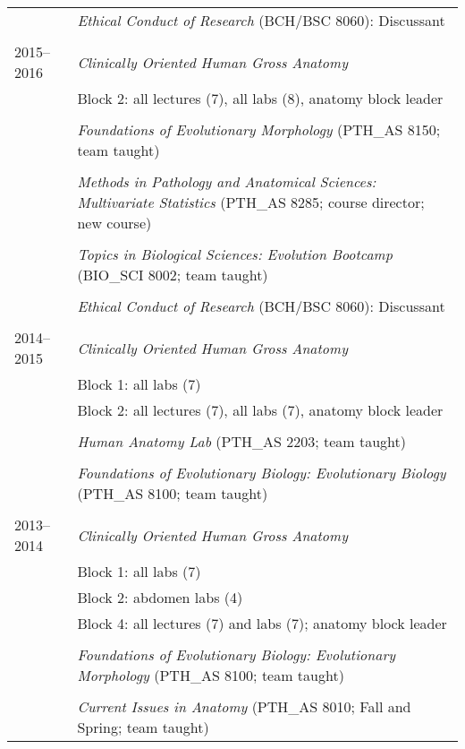 \begin{longtable}{@{}lX@{}}
    \\
    & \textit{Ethical Conduct of Research} (BCH/BSC 8060): Discussant\\
    \\
    2015--2016 & \textit{Clinically Oriented Human Gross Anatomy}\\
    & Block 2: all lectures (7), all labs (8), anatomy block leader\\
    \\
    & \textit{Foundations of Evolutionary Morphology} (PTH\_AS 8150; team taught)\\
    \\
    & \textit{Methods in Pathology and Anatomical Sciences: Multivariate Statistics} (PTH\_AS 8285; course director; new course)\\
    \\
    & \textit{Topics in Biological Sciences: Evolution Bootcamp} (BIO\_SCI 8002; team taught)\\
    \\
    & \textit{Ethical Conduct of Research} (BCH/BSC 8060): Discussant\\
    \\
    2014--2015& \textit{Clinically Oriented Human Gross Anatomy}\\
    & Block 1: all labs (7)\\
    & Block 2: all lectures (7), all labs (7), anatomy block leader\\
    \\
    & \textit{Human Anatomy Lab} (PTH\_AS 2203; team taught)\\
    \\
    & \textit{Foundations of Evolutionary Biology: Evolutionary Biology} (PTH\_AS 8100; team taught)\\
    \\
    2013--2014 & \textit{Clinically Oriented Human Gross Anatomy}\\
    & Block 1: all labs (7)\\
    & Block 2: abdomen labs (4)\\
    & Block 4: all lectures (7) and labs (7); anatomy block leader\\
    \\
    & \textit{Foundations of Evolutionary Biology: Evolutionary Morphology} (PTH\_AS 8100; team taught)\\
    \\
    & \textit{Current Issues in Anatomy} (PTH\_AS 8010; Fall and Spring; team taught)\\

\end{longtable}
